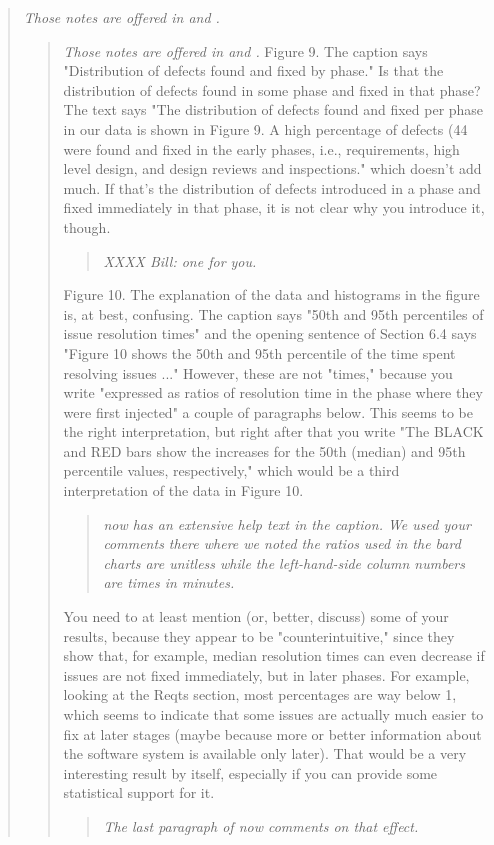 \begin{quote}{\em 
Those notes are offered in  and .}
\begin{quote}{\em 
Those notes are offered in  and .}
Figure 9. The caption says "Distribution of defects found
and fixed by phase." Is that the distribution of defects
found in some phase and fixed in that phase? The text says
"The distribution of defects found and fixed per phase in
our data is shown in Figure 9. A high percentage of defects
(44\) were found and fixed in the early phases, i.e.,
requirements, high level design, and design reviews and
inspections." which doesn't add much. If that's the
distribution of defects introduced in a phase and fixed
immediately in that phase, it is not clear why you introduce
it, though.
\begin{quote}
{\em XXXX Bill: one for you.}
\end{quote}
Figure 10. The explanation of the data and histograms in the
figure is, at best, confusing. The caption says "50th and
95th percentiles of issue resolution times" and the opening
sentence of Section 6.4 says "Figure 10 shows the 50th and
95th percentile of the time spent resolving issues ..."
However, these are not "times," because you write "expressed
as ratios of resolution time in the phase where they were
first injected" a couple of paragraphs below. This seems to
be the right interpretation, but right after that you write
"The BLACK and RED bars show the increases for the 50th
(median) and 95th percentile values, respectively," which
would be a third interpretation of the data in Figure 10.
\begin{quote}
{\em {} now has an extensive help text in the caption.
We used your comments there where we noted the ratios used in the
bard charts are unitless while the left-hand-side column numbers are
times in minutes.
}
\end{quote}
 
You need to at least mention (or, better, discuss) some of
your results, because they appear to be "counterintuitive,"
since they show that, for example, median resolution times
can even decrease if issues are not fixed immediately, but
in later phases. For example, looking at the Reqts section,
most percentages are way below 1, which seems to indicate
that some issues are actually much easier to fix at later
stages (maybe because more or better information about the
software system is available only later). That would be a
very interesting result by itself, especially if you can
provide some statistical support for it.
\begin{quote}{\em
The last paragraph of  now comments
on that effect. }
\end{quote}


\end{quote}
\end{quote}
